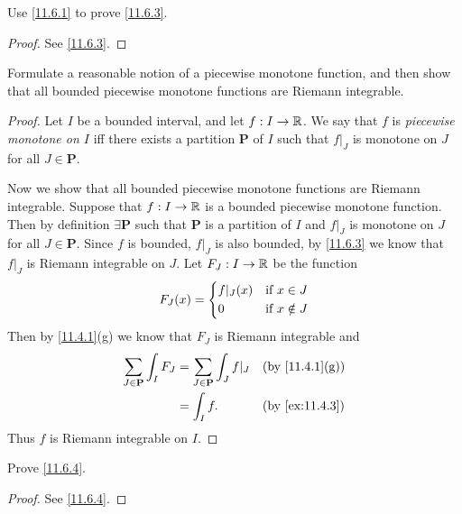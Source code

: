 \exercisesection

\begin{ex}\label{ex:11.6.1}
  Use \cref{11.6.1} to prove \cref{11.6.3}.
\end{ex}

\begin{proof}
  See \cref{11.6.3}.
\end{proof}

\begin{ex}\label{ex:11.6.2}
  Formulate a reasonable notion of a piecewise monotone function, and then show that all bounded piecewise monotone functions are Riemann integrable.
\end{ex}

\begin{proof}
  Let \(I\) be a bounded interval, and let \(f : I \to \mathbb{R}\).
  We say that \(f\) is \emph{piecewise monotone on \(I\)} iff there exists a partition \(\mathbf{P}\) of \(I\) such that \(f|_J\) is monotone on \(J\) for all \(J \in \mathbf{P}\).

  Now we show that all bounded piecewise monotone functions are Riemann integrable.
  Suppose that \(f : I \to \mathbb{R}\) is a bounded piecewise monotone function.
  Then by definition \(\exists \mathbf{P}\) such that \(\mathbf{P}\) is a partition of \(I\) and \(f|_J\) is monotone on \(J\) for all \(J \in \mathbf{P}\).
  Since \(f\) is bounded, \(f|_J\) is also bounded, by \cref{11.6.3} we know that \(f|_J\) is Riemann integrable on \(J\).
  Let \(F_J : I \to \mathbb{R}\) be the function
  \[
    F_J(x) = \begin{dcases}
      f|_J(x) & \text{if } x \in J    \\
      0       & \text{if } x \notin J
    \end{dcases}
  \]
  Then by \cref{11.4.1}(g) we know that \(F_J\) is Riemann integrable and
  \begin{align*}
    \sum_{J \in \mathbf{P}} \int_I F_J & = \sum_{J \in \mathbf{P}} \int_J f|_J &  & \text{(by \cref{11.4.1}(g))} \\
                                       & = \int_I f.                           &  & \by{ex:11.4.3}
  \end{align*}
  Thus \(f\) is Riemann integrable on \(I\).
\end{proof}

\begin{ex}\label{ex:11.6.3}
  Prove \cref{11.6.4}.
\end{ex}

\begin{proof}
  See \cref{11.6.4}.
\end{proof}

